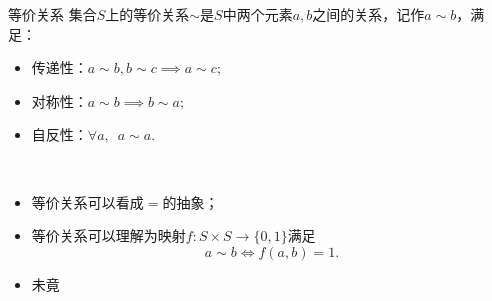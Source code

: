 \begin{definition}{等价关系}{}
	集合$S$上的等价关系$\sim$是$S$中两个元素$a,b$之间的关系，记作$a\sim b$，满足：
	\begin{itemize}
		\item 传递性：$a\sim b,b\sim c\implies a\sim c;$
		\item 对称性：$a\sim b\implies b\sim a;$
		\item 自反性：$\forall a,\enspace a\sim a.$
	\end{itemize}
\end{definition}
\begin{remark}~
	\begin{itemize}
		\item 等价关系可以看成$=$的抽象；
		\item 等价关系可以理解为映射$f:S\times S\to\{0,1\}$满足 
		\[
			a\sim b\iff f(a,b)=1.
		\]
		\item 未竟
	\end{itemize}
\end{remark}


